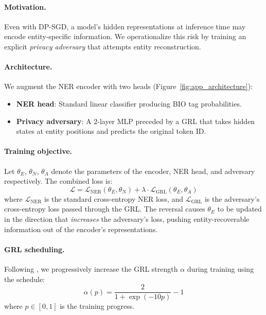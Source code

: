 \documentclass[11pt,a4paper]{article}
\begin{document}
\paragraph{Motivation.}
Even with DP-SGD, a model's hidden representations at inference time may
encode entity-specific information.  We operationalize this risk by training
an explicit \emph{privacy adversary} that attempts entity reconstruction.

\paragraph{Architecture.}
We augment the NER encoder with two heads (Figure~\ref{fig:app_architecture}):
\begin{itemize}
    \item \textbf{NER head}: Standard linear classifier producing BIO tag
    probabilities.
    \item \textbf{Privacy adversary}: A 2-layer MLP preceded by a GRL that
    takes hidden states at entity positions and predicts the original token ID.
\end{itemize}

\paragraph{Training objective.}
Let $\theta_E$, $\theta_N$, $\theta_A$ denote the parameters of the encoder,
NER head, and adversary respectively.  The combined loss is:
\begin{equation}
    \mathcal{L} = \mathcal{L}_{\text{NER}}(\theta_E, \theta_N)
    + \lambda \cdot \mathcal{L}_{\text{GRL}}(\theta_E, \theta_A)
    \label{eq:app_loss}
\end{equation}
where $\mathcal{L}_{\text{NER}}$ is the standard cross-entropy NER loss, and
$\mathcal{L}_{\text{GRL}}$ is the adversary's cross-entropy loss passed through
the GRL.  The reversal causes $\theta_E$ to be updated in the direction that
\emph{increases} the adversary's loss, pushing entity-recoverable information
out of the encoder's representations.

\paragraph{GRL scheduling.}
Following \citet{ganin2016domain}, we progressively increase the GRL strength
$\alpha$ during training using the schedule:
\begin{equation}
    \alpha(p) = \frac{2}{1 + \exp(-10p)} - 1
\end{equation}
where $p \in [0, 1]$ is the training progress.
\end{document}
